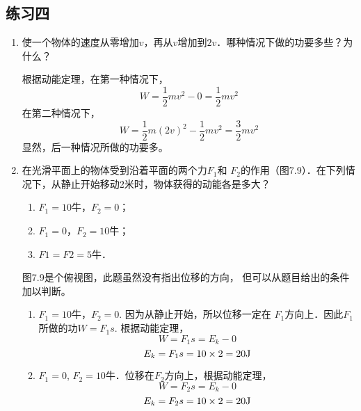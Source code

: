 \subsection{练习四}
\begin{enumerate}
    \item 使一个物体的速度从零增加$v$，再从$v$增加到$2v$．哪种情况下做的功要多些？为什么？

    \begin{solution}
    根据动能定理，在第一种情况下，
\[W=\frac{1}{2}mv^2-0=\frac{1}{2}mv^2\]
在第二种情况下，
\[W=\frac{1}{2}m(2v)^2-\frac{1}{2}mv^2=\frac{3}{2}mv^2\]
显然，后一种情况所做的功要多。
    \end{solution}
    \item 在光滑平面上的物体受到沿着平面的两个力$F_1$和
    $F_2$的作用（图7.9）．在下列情况下，从静止开始移动2米时，物体获得的动能各是多大？
    \begin{enumerate}
        \item $F_1=10$牛，$F_2=0$；
        \item $F_1=0$，$F_2=10$牛；
        \item $F1=F2=5$牛．
    \end{enumerate}


    \begin{solution}
图7.9是个俯视图，此题虽然没有指出位移的方向，
但可以从题目给出的条件加以判断。
\begin{enumerate}
    \item $F_1=10$牛，$F_2=0$. 因为从静止开始，所以位移一定在
    $F_1$方向上．因此$F_1$所做的功$W=F_1s$. 根据动能定理，
    \[W=F_1s=E_k-0\]
   \[ E_k=F_1s=10\times2=20{\rm J}\]
    \item $F_1=0$, $F_2=10$牛．位移在$F_2$方向上，根据动能定理，
\[    W=F_2s=E_k-0\]
\[    E_k=F_2s=10\times2=20{\rm J}\]


\end{enumerate}
\end{solution}
\end{enumerate}
